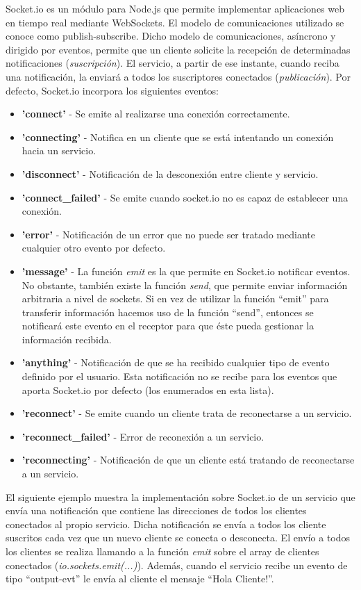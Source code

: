 \documentclass[12pt, a4paper, spanish]{scrartcl}
\begin{document}
Socket.io es un módulo para Node.js que permite implementar aplicaciones web en tiempo real mediante WebSockets. El modelo de comunicaciones utilizado se conoce como publish-subscribe. Dicho modelo de comunicaciones, asíncrono y dirigido por eventos, permite que un cliente solicite la recepción de determinadas notificaciones (\emph{suscripción}). El servicio, a partir de ese instante, cuando reciba una notificación, la enviará a todos los suscriptores conectados (\emph{publicación}). Por defecto, Socket.io incorpora los siguientes eventos:

\begin{itemize}
\item \textbf{'connect'} - Se emite al realizarse una conexión correctamente.
\item \textbf{'connecting'} - Notifica en un cliente que se está intentando un conexión hacia un servicio.
\item \textbf{'disconnect'} - Notificación de la desconexión entre cliente y servicio.
\item \textbf{'connect\_failed'} - Se emite cuando socket.io no es capaz de establecer una conexión.
\item \textbf{'error'} - Notificación de un error que no puede ser tratado mediante cualquier otro evento por defecto.
\item \textbf{'message'} - La función \emph{emit} es la que permite en Socket.io notificar eventos. No obstante, también existe la función \emph{send}, que permite enviar información arbitraria a nivel de sockets. Si en vez de utilizar la función ``emit'' para transferir información hacemos uso de la función ``send'', entonces se notificará este evento en el receptor para que éste pueda gestionar la información recibida. 
\item \textbf{'anything'} - Notificación de que se ha recibido cualquier tipo de evento definido por el usuario. Esta notificación no se recibe para los eventos que aporta Socket.io por defecto (los enumerados en esta lista).
\item \textbf{'reconnect'} - Se emite cuando un cliente trata de reconectarse a un servicio.
\item \textbf{'reconnect\_failed'} - Error de reconexión a un servicio.
\item \textbf{'reconnecting'} - Notificación de que un cliente está tratando de reconectarse a un servicio.
\end{itemize}

El siguiente ejemplo muestra la implementación sobre Socket.io de un servicio que envía una notificación que contiene las direcciones de todos los clientes conectados al propio servicio. Dicha notificación se envía a todos los cliente suscritos cada vez que un nuevo cliente se conecta o desconecta. El envío a todos los clientes se realiza llamando a la función \emph{emit} sobre el array de clientes conectados (\emph{io.sockets.emit(...)}). Además, cuando el servicio recibe un evento de tipo ``output-evt'' le envía al cliente el mensaje ``Hola Cliente!''.
\end{document}
